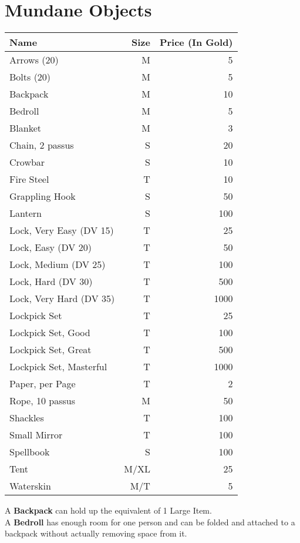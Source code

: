 \section{Mundane Objects}
\begin{longtable}{l | r | r}
	Name & Size & Price (In Gold)\\ \hline
	Arrows (20) & M & 5\\
	Bolts (20) & M & 5\\
	Backpack & M & 10\\
	Bedroll & M & 5\\
	Blanket & M & 3\\
	Chain, 2 passus & S & 20\\
	Crowbar & S & 10\\
	Fire Steel & T & 10\\
	Grappling Hook & S & 50\\
	Lantern & S & 100\\
	Lock, Very Easy (DV 15) & T & 25\\
	Lock, Easy (DV 20) & T & 50\\
	Lock, Medium (DV 25) & T & 100\\
	Lock, Hard (DV 30) & T & 500\\
	Lock, Very Hard (DV 35) & T & 1000\\
	Lockpick Set & T & 25\\
	Lockpick Set, Good & T & 100\\
	Lockpick Set, Great & T & 500\\
	Lockpick Set, Masterful & T & 1000\\
	Paper, per Page & T & 2\\
	Rope, 10 passus & M & 50\\
	Shackles & T & 100\\
	Small Mirror & T & 100\\
	Spellbook & S & 100\\
	Tent & M/XL & 25\\
	Waterskin & M/T & 5\\
\end{longtable}



A \textbf{Backpack} can hold up the equivalent of 1 Large Item.\\

A \textbf{Bedroll} has enough room for one person and can be folded and attached to a backpack without actually removing space from it.\\

